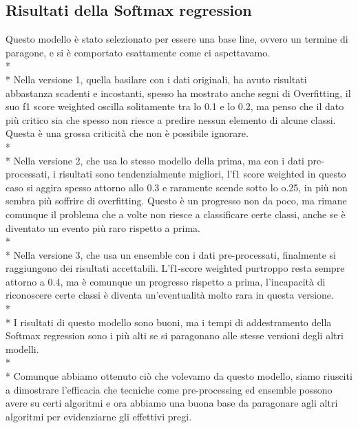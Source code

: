 \subsection{Risultati della Softmax regression}\label{ssec:softmaxRes}
\normalsize
Questo modello è stato selezionato per essere una base line, ovvero un termine di paragone, e si è comportato esattamente come ci aspettavamo.\\*\\*
Nella versione 1, quella basilare con i dati originali, ha avuto risultati abbastanza scadenti e incostanti, spesso ha mostrato anche segni di Overfitting, il suo f1 score weighted oscilla solitamente tra lo 0.1 e lo 0.2, ma penso che il dato più critico sia che spesso non riesce a predire nessun elemento di alcune classi. Questa è una grossa criticità che non è possibile ignorare.\\*\\*
Nella versione 2, che usa lo stesso modello della prima, ma con i dati pre-processati, i risultati sono tendenzialmente migliori, l’f1 score weighted in questo caso si aggira spesso attorno allo 0.3 e raramente scende sotto lo o.25, in più non sembra più soffrire di overfitting. Questo è un progresso non da poco, ma rimane comunque il problema che a volte non riesce a classificare certe classi, anche se è diventato un evento più raro rispetto a prima.\\*\\*
Nella versione 3, che usa un ensemble con i dati pre-processati, finalmente si raggiungono dei risultati accettabili. L'f1-score weighted purtroppo resta sempre attorno a 0.4, ma è comunque un progresso rispetto a prima, l'incapacità di riconoscere certe classi è diventa un'eventualità molto rara in questa versione.\\*\\*
I risultati di questo modello sono buoni, ma i tempi di addestramento della Softmax regression sono i più alti se si paragonano alle stesse versioni degli altri modelli.\\*\\*
Comunque abbiamo ottenuto ciò che volevamo da questo modello, siamo riusciti a dimostrare l’efficacia che tecniche come pre-processing ed ensemble possono avere su certi algoritmi e ora abbiamo una buona base da paragonare agli altri algoritmi per evidenziarne gli effettivi pregi.
